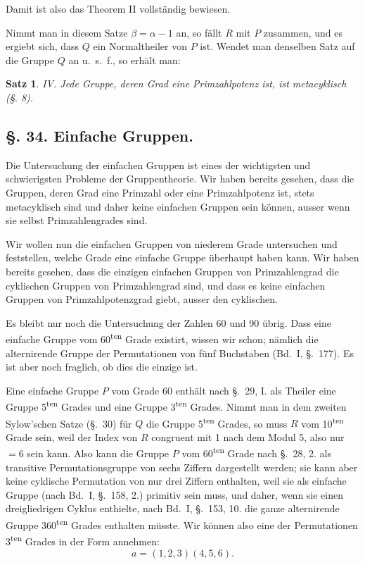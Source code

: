 \documentclass[12pt,a4paper]{article}
\theoremstyle{plain}
\newtheorem{satz}{Satz}[section]
\theoremstyle{definition}
\theoremstyle{remark}
\begin{document}
Damit ist also das Theorem II vollständig bewiesen.

Nimmt man in diesem Satze $\beta = \alpha - 1$ an, so fällt $R$ mit $P$ zusammen, und es ergiebt sich, dass $Q$ ein Normaltheiler von $P$ ist. Wendet man denselben Satz auf die Gruppe $Q$ an u.~s.~f., so erhält man:

\begin{satz}
IV. Jede Gruppe, deren Grad eine Primzahlpotenz ist, ist metacyklisch (\S. 8).
\end{satz}


\subsection*{\S. 34. Einfache Gruppen.}

Die Untersuchung der einfachen Gruppen ist eines der wichtigsten und schwierigsten Probleme der Gruppentheorie. Wir haben bereits gesehen, dass die Gruppen, deren Grad eine Primzahl oder eine Primzahlpotenz ist, stets metacyklisch sind und daher keine einfachen Gruppen sein können, ausser wenn sie selbst Primzahlengrades sind.

Wir wollen nun die einfachen Gruppen von niederem Grade untersuchen und feststellen, welche Grade eine einfache Gruppe überhaupt haben kann. Wir haben bereits gesehen, dass die einzigen einfachen Gruppen von Primzahlengrad die cyklischen Gruppen von Primzahlengrad sind, und dass es keine einfachen Gruppen von Primzahlpotenzgrad giebt, ausser den cyklischen.

Es bleibt nur noch die Untersuchung der Zahlen 60 und 90 übrig. Dass eine einfache Gruppe vom 60\textsuperscript{ten} Grade existirt, wissen wir schon; nämlich die alternirende Gruppe der Permutationen von fünf Buchstaben (Bd.~I, \S.~177). Es ist aber noch fraglich, ob dies die einzige ist.

Eine einfache Gruppe $P$ vom Grade 60 enthält nach \S.~29, I. als Theiler eine Gruppe 5\textsuperscript{ten} Grades und eine Gruppe 3\textsuperscript{ten} Grades. Nimmt man in dem zweiten Sylow'schen Satze (\S.~30) für $Q$ die Gruppe 5\textsuperscript{ten} Grades, so muss $R$ vom 10\textsuperscript{ten} Grade sein, weil der Index von $R$ congruent mit 1 nach dem Modul 5, also nur $= 6$ sein kann. Also kann die Gruppe $P$ vom 60\textsuperscript{ten} Grade nach \S.~28, 2. als transitive Permutationsgruppe von sechs Ziffern dargestellt werden; sie kann aber keine cyklische Permutation von nur drei Ziffern enthalten, weil sie als einfache Gruppe (nach Bd.~I, \S.~158, 2.) primitiv sein muss, und daher, wenn sie einen dreigliedrigen Cyklus enthielte, nach Bd.~I, \S.~153, 10. die ganze alternirende Gruppe 360\textsuperscript{ten} Grades enthalten müsste. Wir können also eine der Permutationen 3\textsuperscript{ten} Grades in der Form annehmen:
\[
a = (1,2,3)(4,5,6).
\]
\end{document}
